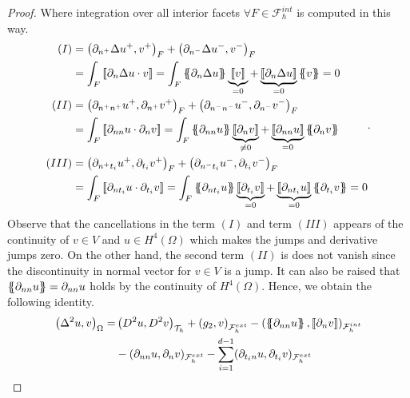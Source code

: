 \begin{proof}
Where integration over all interior facets $ \forall F \in \mathcal{F}_{h}^{int}$ is computed in this way.
\begin{equation*}
    \begin{split}
        (I) &  =    \left(\partial _{n^{+}} \Delta  u^{+} ,v^{+}\right)_{F} +
        \left(\partial _{n^{-}} \Delta  u^{-} ,v^{-}\right)_{F}  \\
            & =   \int_{F}^{}
            \jump{ \partial _{n} \Delta  u \cdot v } =
            \int_{F}^{}
            \mean{ \partial _{n} \Delta  u } \underbrace{\jump{ v }}_{= 0}    + \underbrace{\jump{ \partial _{n} \Delta  u
            }}_{= 0}    \mean{ v } = 0 \\
            (II) &  =     \left(\partial _{n^{+}n^{+}} u^{+}, \partial_{n^{+}} v^{+} \right)_{F} +  \left(\partial _{n^{-}n^{-}} u^{-}, \partial_{n^{-}} v^{-} \right)_{F}    \\
                 &= \int_{F}^{} \jump{ \partial _{nn} u \cdot  \partial_{n} v }   = \int_{F}^{}
                       \mean{ \partial _{nn} u    } \underbrace{\jump{ \partial_{n} v }  }_{\neq 0}    + \underbrace{\jump{ \partial
                               _{nn}  u
                       }}_{= 0}    \mean{ \partial _{n}v } \\
            (III) &  =     \left(\partial _{n^{+}t_{i}} u^{+}, \partial_{t_{i}} v^{+}
                \right)_{F} +  \left(\partial _{n^{-}t_{i}} u^{-}, \partial_{t_{i}} v^{-}
                \right)_{F}   \\
                 &  =   \int_{F}^{}
                 \jump{ \partial _{nt_{i}} u \cdot  \partial_{t_{i}} v } =
                 \int_{F}^{}
                 \mean{ \partial _{nt_{i}} u    } \underbrace{\jump{ \partial_{t_{i}} v }  }_{= 0}    + \underbrace{\jump{ \partial
                         _{nt_{i}}  u
                 }}_{= 0}    \mean{ \partial _{t_{i}}v }  = 0
                   \end{split}
.\end{equation*}
Observe that the cancellations in the term $(I)$ and term $(III)$  appears of the continuity of $v\in V $ and $u\in H^{4}( \Omega ) $ which makes the jumps and derivative jumps zero. On the other hand, the second term $(II)$  is does not vanish since the discontinuity in normal vector for $v \in V$ is a jump. It can also be raised that $\left\{\!\!\left\{
\partial _{nn} u \right\}\!\!\right\} = \partial _{nn} u  $ holds by the continuity of $H^{4}( \Omega  ) $.
Hence, we obtain the following identity.
\begin{equation}
\label{eq:bi_basic_dg_full_1}
\begin{split}
    \left( \Delta  ^{2} u, v \right) _{\Omega }  =&   \left( D^2u, D^2v \right)_{\mathcal{T} _{h}} +  \left(g_{2}, v  \right) _{\mathcal{F}^{ext}_{h} }  -  ( \left\{\!\!\left\{ \partial _{nn} u \right\}\!\!\right\}   , \left[\!\left[  \partial_{n} v  \right]\!\right] )_{\mathcal{F}_{h}^{int} } \\
                                                  &  - ( \partial _{nn} u , \partial _{n} v)_{\mathcal{F}^{ext}_{h} } - \sum_{i =1  }^{d-1} ( \partial   _{t_{i}n} u  ,  \partial   _{t_{i}}  v  )_{ \mathcal{F}^{ext} _{h}  }
\end{split}
\end{equation}


\end{proof}
